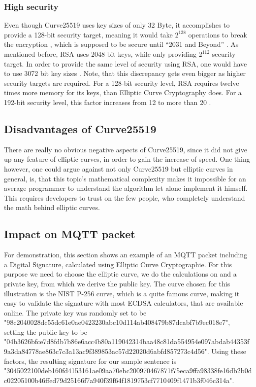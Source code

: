 \subsubsection{High security}
Even though Curve25519 uses key sizes of only 32 Byte, it accomplishes to provide a 128-bit security target, meaning it would take $ 2^{128} $ operations to break the encryption \cite{SecLevel}, which is supposed to be secure until “2031 and Beyond” \cite{KeySize}. As mentioned before, RSA uses 2048 bit keys, while only providing $ 2^{112} $ security target. In order to provide the same level of security using RSA, one would have to use 3072 bit key sizes \cite{KeySize}. Note, that this discrepancy gets even bigger as higher security targets are required. For a 128-bit security level, RSA requires twelve times more memory for its keys, than Elliptic Curve Cryptography does. For a 192-bit security level, this factor increases from 12 to more than 20 \cite{SecLevelInc}.

\subsection{Disadvantages of Curve25519}
There are really no obvious negative aspects of Curve25519, since it did not give up any feature of elliptic curves, in order to gain the increase of speed. One thing however, one could argue against not only Curve25519 but elliptic curves in general, is, that this topic's mathematical complexity makes it impossible for an average programmer to understand the algorithm let alone implement it himself. This requires developers to trust on the few people, who completely understand the math behind elliptic curves.

\newpage

\subsection{Impact on MQTT packet}
For demonstration, this section shows an example of an MQTT packet including a Digital Signature, calculated using Elliptic Curve Cryptographie. For this purpose we need to choose the elliptic curve, we do the calculations on and a private key, from which we derive the public key. The curve chosen for this illustration is the NIST P-256 curve, which is a quite famous curve, making it easy to validate the signature with most ECDSA calculators, that are available online. The private key was randomly set to be "98c2040028dc55dc61e0ae0423230abc10d114ab408479b87dcabf7b9ec018e7", setting the public key to be "04b3626bfce7d8fdb7b86e6acc4b80a119042314baa48c81da554954e097abdab44353f9a3da84778ae863c7c3a13ac9f389853ac57d22020d6abfd857273c4d56".
Using these factors, the resulting signature for our sample sentence is "3045022100deb160fd4153161ae09aa70ebc200970467871f75eca9ffa98338fe16db2b0dc02205100b46ffed79d25166f7a940f39f64f1819753cf7710409f1471b3f046c314a". 


